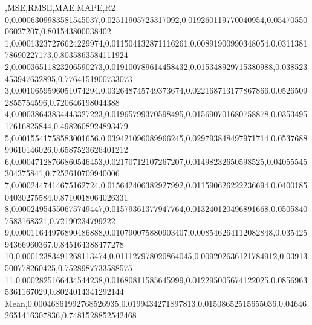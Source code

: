 ,MSE,RMSE,MAE,MAPE,R2
0,0.0006309983581545037,0.02511905725317092,0.019260119770040954,0.0547055006037207,0.801543800038402
1,0.00013237276624229974,0.011504132871116261,0.00891900990348054,0.031138178690227173,0.8035863584111924
2,0.00036511823206590273,0.019100789614458432,0.015348929715380988,0.038523453947632895,0.7764151900733073
3,0.0010659596051074294,0.032648745749373674,0.022168713177867866,0.05265092855754596,0.720646198044388
4,0.00038643834443327223,0.01965799370598495,0.015690701680758878,0.035349517616825844,0.4982608924893479
5,0.0015541758583001656,0.039421096089966245,0.029793848497971714,0.053768899610146026,0.6587523626401212
6,0.00047128766860546453,0.02170712107267207,0.01498232650598525,0.04055545304375841,0.7252610709940006
7,0.0002447414675162724,0.015642406382927992,0.011590626222236694,0.040018504030275584,0.8710018064026331
8,0.00024954550675749447,0.01579361377947764,0.013240120496891668,0.05058407583168321,0.72190234799222
9,0.00011644976890486888,0.010790075880903407,0.008546264112082848,0.03542594366960367,0.845164388477278
10,0.00012383491268113474,0.011127978020864045,0.009202636121784912,0.03913500778260425,0.7528987733588575
11,0.0002825166434544238,0.01680811585645999,0.012295005674122025,0.08569635361167029,0.8024014341292144
Mean,0.00046861992768526935,0.0199434271897813,0.01508652515655036,0.046462651416307836,0.7481528852542468
